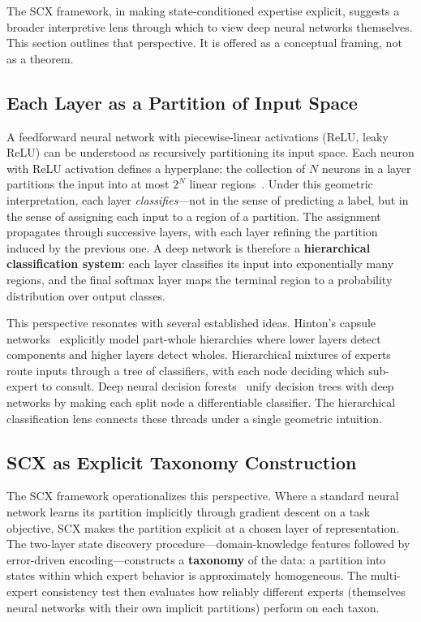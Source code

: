 \documentclass[twocolumn]{article}
\theoremstyle{definition}
\begin{document}
The SCX framework, in making state-conditioned expertise explicit, suggests a broader interpretive lens through which to view deep neural networks themselves. This section outlines that perspective. It is offered as a conceptual framing, not as a theorem.

\subsection{Each Layer as a Partition of Input Space}

A feedforward neural network with piecewise-linear activations (ReLU, leaky ReLU) can be understood as recursively partitioning its input space. Each neuron with ReLU activation defines a hyperplane; the collection of $N$ neurons in a layer partitions the input into at most $2^N$ linear regions~\cite{montufar2014}. Under this geometric interpretation, each layer \emph{classifies}---not in the sense of predicting a label, but in the sense of assigning each input to a region of a partition. The assignment propagates through successive layers, with each layer refining the partition induced by the previous one. A deep network is therefore a \textbf{hierarchical classification system}: each layer classifies its input into exponentially many regions, and the final softmax layer maps the terminal region to a probability distribution over output classes.

This perspective resonates with several established ideas. Hinton's capsule networks~\cite{sabour2017capsules} explicitly model part-whole hierarchies where lower layers detect components and higher layers detect wholes. Hierarchical mixtures of experts~\cite{jordan1994hierarchical} route inputs through a tree of classifiers, with each node deciding which sub-expert to consult. Deep neural decision forests~\cite{kontschieder2015deep} unify decision trees with deep networks by making each split node a differentiable classifier. The hierarchical classification lens connects these threads under a single geometric intuition.

\subsection{SCX as Explicit Taxonomy Construction}

The SCX framework operationalizes this perspective. Where a standard neural network learns its partition implicitly through gradient descent on a task objective, SCX makes the partition explicit at a chosen layer of representation. The two-layer state discovery procedure---domain-knowledge features followed by error-driven encoding---constructs a \textbf{taxonomy} of the data: a partition into states within which expert behavior is approximately homogeneous. The multi-expert consistency test then evaluates how reliably different experts (themselves neural networks with their own implicit partitions) perform on each taxon.
\end{document}

